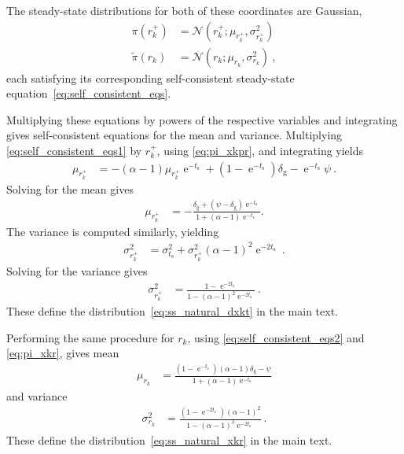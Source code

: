 \documentclass[%
reprint,
bibnotes, amsmath, amssymb, aps, pre,
 showkeys,
floatfix
]{revtex4-2}
\newcommand{\mrm}{\mathrm}
\newcommand{\mcal}{\mathcal}
\newcommand{\pr}[1]{\left(#1\right)} %
\newcommand{\dg}{\delta_{\mrm{g}}}
\newcommand{\ts}{t_{\mrm{s}}}
\newcommand{\xkr}{r_{k}}
\newcommand{\xkpr}{r_{k}^{+}}
\DeclareMathOperator{\e}{e}
\begin{document}
The steady-state distributions for both of these coordinates are Gaussian,
\begin{subequations}
    \begin{align}
        \pi\pr{\xkpr} &= \mcal{N}\pr{\xkpr;\mu_{\xkpr},\sigma_{\xkpr}^{2}}\label{eq:pi_xkpr}\\
        \tilde\pi\pr{\xkr} &= \mcal{N}\pr{\xkr;\mu_{\xkr},\sigma_{\xkr}^{2}}\ ,\label{eq:pi_xkr}
    \end{align}
\end{subequations}
each satisfying its corresponding self-consistent steady-state equation~\eqref{eq:self_consistent_eqs}.

Multiplying these equations by powers of the respective variables and integrating gives self-consistent equations for the mean and variance.
Multiplying \eqref{eq:self_consistent_eqs1} by $\xkpr$, using \eqref{eq:pi_xkpr}, and integrating yields
\begin{align}
    \mu_{\xkpr} &= -\pr{\alpha-1}\mu_{\xkpr}\e^{-\ts} + \pr{1-\e^{-\ts}}\dg - \e^{-\ts}\psi\ .\nonumber
\end{align}
Solving for the mean gives
\begin{align}
    \mu_{\xkpr} &= -\frac{\dg+(\psi-\dg)\e^{-\ts}}{1+(\alpha-1)\e^{-\ts}}.\label{eq:mean_dxkt}
\end{align}
The variance is computed similarly, yielding
\begin{align}
    \sigma_{\xkpr}^{2} &= \sigma_{\ts}^{2}+\sigma_{\xkpr}^{2}\pr{\alpha-1}^{2}\e^{-2\ts}\ . 
\end{align}
Solving for the variance gives
\begin{align}
    \sigma_{\xkpr}^{2} &= \frac{1-\e^{-2\ts}}{1-(\alpha-1)^{2}\e^{-2\ts}}\ .
\end{align}
These define the distribution~\eqref{eq:ss_natural_dxkt} in the main text. 

Performing the same procedure for $\xkr$, using \eqref{eq:self_consistent_eqs2} and \eqref{eq:pi_xkr}, gives mean 
\begin{align}
    \mu_{\xkr} &= \frac{\pr{1-\e^{-\ts}}\pr{\alpha-1}\dg -\psi}{1+(\alpha-1)\e^{-\ts}}\label{eq:mean_xkr} 
\end{align}
and variance
\begin{align}
    \sigma_{\xkr}^{2} &= \frac{\pr{1-\e^{-2\ts}} \pr{\alpha-1}^{2}}{1-(\alpha-1)^{2}\e^{-2\ts}}\ .
\end{align} 
These define the distribution~\eqref{eq:ss_natural_xkr} in the main text.
\end{document}
